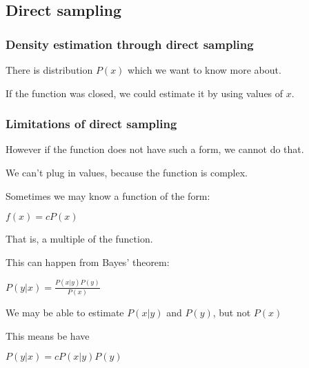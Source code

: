 
\subsection{Direct sampling}

\subsubsection{Density estimation through direct sampling}

There is distribution \(P(x)\) which we want to know more about.

If the function was closed, we could estimate it by using values of \(x\).

\subsubsection{Limitations of direct sampling}

However if the function does not have such a form, we cannot do that.

We can't plug in values, because the function is complex.

Sometimes we may know a function of the form:

\(f(x)=cP(x)\)

That is, a multiple of the function.

This can happen from Bayes' theorem:

\(P(y|x)=\frac{P(x|y)P(y)}{P(x)}\)

We may be able to estimate \(P(x|y)\) and \(P(y)\), but not \(P(x)\)

This means be have 

\(P(y|x)=cP(x|y)P(y)\)

